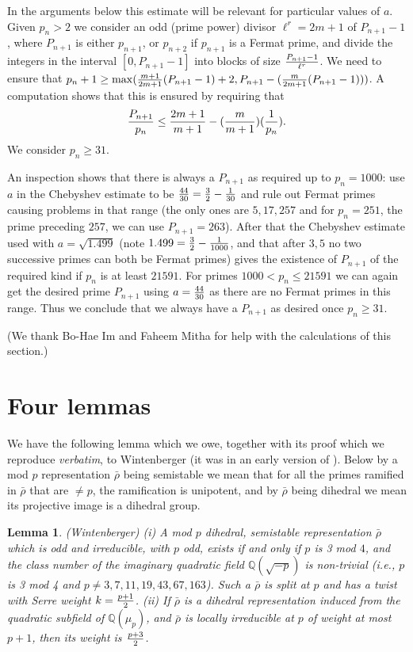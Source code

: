 \documentclass[12pt]{amsart}
\newcommand{\Q}{\mathbb{Q}}
\newcommand{\rhobar}{\overline{\rho}}
\newtheorem{lemma}[theorem]{Lemma}
\def\rhobar{ {\bar {\rho} } }
\def\rhob{ {\bar {\rho} } }
\begin{document}
In the arguments below this estimate will be relevant for particular values of $a$. Given $p_n>2$ we consider an odd (prime power) 
divisor $\ell^r=2m+1$ of 
$P_{n+1}-1$, where $P_{n+1}$ is either $p_{n+1}$, or $p_{n+2}$ if $p_{n+1}$ is a Fermat prime,  
and divide the integers in the interval $[0,P_{n+1}-1]$ into blocks of size ${{P_{n+1}-1} \over {\ell^r}}$. We need to  ensure that
$p_n+1 \geq {\rm max}({{m+1} \over {2m+1}}({P_{n+1}-1}  )+2,
P_{n+1}-({{m} \over {2m+1}}({P_{n+1}-1}  )))$. A computation shows that
this is ensured by requiring that
$${{P_{n+1}}\over p_n} \leq {2m+1 \over {m+1}} - ({m \over {m+1}})({1 \over {p_n}}).$$
We consider $p_n \geq 31$.

An inspection shows that there is always a $P_{n+1}$ as required up to $p_n=1000$: use $a$ in the Chebyshev estimate to be ${44 \over 30}={3 \over 2} -{1 \over 30}$ and rule out Fermat primes causing problems in that range (the only ones are $5,17,257$ and for $p_n=251$, the prime preceding $257$, we can use $P_{n+1}=263$).
After that the Chebyshev estimate used with $a=\sqrt{1.499}$ (note $1.499={3 \over 2} - {1 \over 1000}$, and that after $3,5$ no two successive primes can both be Fermat primes) 
gives the existence of $P_{n+1}$ of the required kind if $p_n$ is at least $21591$. For primes $1000<p_n \leq 21591$ we can again get the desired prime $P_{n+1}$ using $a={44 \over 30}$ as there are no Fermat primes in this range.
Thus we conclude that we always have a $P_{n+1}$ as desired 
once $p_n \geq  31$.

(We thank Bo-Hae Im and Faheem Mitha for help with the calculations of this section.)

\section{Four lemmas}

We have the following lemma which we owe, 
together with its proof which we reproduce {\it verbatim}, to Wintenberger
(it was in an early version of \cite{KW}). Below by a mod $p$ representation $\rhobar$ being semistable
we mean that for all the primes ramified in $\rhobar$ that are $\neq p$, the 
ramification is unipotent, and by $\rhobar$ being dihedral we mean its projective image is a dihedral group.

\begin{lemma}\label{dihedral}(Wintenberger)
 (i) A mod $p$ dihedral, semistable representation $\rhobar$
which is odd and irreducible, with $p$ odd, exists if  and only if $p$ is 3 mod $4$, and
the class number of the imaginary quadratic field $\Q(\sqrt{ -p })$
is non-trivial (i.e., $p$ is 3 mod 4 and $p \neq 3, 7, 11, 19,
43, 67,163$). Such a $\rhobar$ is split at $p$ and has a twist with Serre weight
$k={ {p+1} \over 2}$.
 (ii) If $\rhob$ is a dihedral representation  induced from the quadratic
subfield of $\Q(\mu_p)$,
and $\rhob$ is locally irreducible at $p$ of weight at most $p+1$, then its
weight is $p+3 \over 2$.
 
\end{lemma}
\end{document}
